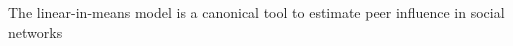 \documentclass[final]{beamer}
\newlength{\colwidth}
\begin{document}
\begin{frame}[t]
\begin{columns}[t]
\begin{column}{\colwidth}
\begin{block}{The linear-in-means model is a canonical tool to estimate peer influence in social networks}




\end{block}
\end{column}
\end{columns}
\end{frame}
\end{document}
